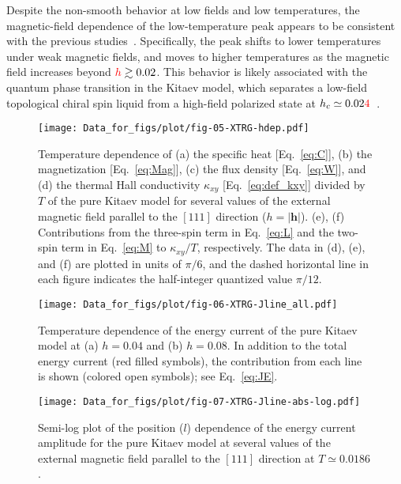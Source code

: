 \documentclass[twocolumn,superscriptaddress,showpacs, longbibliography, aps, prx]{revtex4-2}
\newcommand{\red}[1]{\textcolor{red}{#1}}
\begin{document}
Despite the non-smooth behavior at low fields and low temperatures, the magnetic-field dependence of the low-temperature peak appears to be consistent with the previous studies~\cite{YoshitakeNKM2020,Li2020,LiZWWGQLGL2021,LiLXGQLS2024}. 
Specifically, the peak shifts to lower temperatures under weak magnetic fields, and moves to higher temperatures as the magnetic field increases beyond $%
\red{h} \gtrsim 0.02$.
This behavior is likely associated with the quantum phase transition in the Kitaev model, which separates a low-field topological chiral spin liquid from a high-field polarized state at $h_c \simeq 0.02\red{4}$\red{~\cite{Gohlke2018}}. %

\begin{figure}
  \begin{center}
    \texttt{[image: Data\_for\_figs/plot/fig-05-XTRG-hdep.pdf]}
  \end{center}
  \caption{Temperature dependence of (a) the specific heat [Eq.~\eqref{eq:C}], (b) the magnetization [Eq.~\eqref{eq:Mag}], (c) the flux density [Eq.~\eqref{eq:W}], and (d) the thermal Hall conductivity $\kappa_{xy}$ [Eq.~\eqref{eq:def_kxy}] divided by $T$ of the pure Kitaev model for several values of the external magnetic field parallel to the $[111]$ direction ($h=|\bm{h}|$). (e), (f) Contributions from the three-spin term in Eq.~\eqref{eq:L} and the two-spin term in Eq.~\eqref{eq:M} to $\kappa_{xy}/T$, respectively. The data in (d), (e), and (f) are plotted in units of $\pi/6$, and the dashed horizontal line in each figure indicates the half-integer quantized value $\pi/12$.
  }
  \label{fig:CMF_pure}
\end{figure}

\begin{figure}[htb]
  \begin{center}
    \texttt{[image: Data\_for\_figs/plot/fig-06-XTRG-Jline\_all.pdf]}
  \end{center}
  \caption{Temperature dependence of the energy current of the pure Kitaev model at (a) $h=0.04$ and (b) $h=0.08$. In addition to the total energy current (red filled symbols), the contribution from each line is shown (colored open symbols); see Eq.~\eqref{eq:JE}.
}
  \label{fig:J_line}
\end{figure}

\begin{figure}[htb]
  \begin{center}
    \texttt{[image: Data\_for\_figs/plot/fig-07-XTRG-Jline-abs-log.pdf]}
  \end{center}
  \caption{Semi-log plot of the position ($l$) dependence of the energy current amplitude for the pure Kitaev model at several values of the external magnetic field parallel to the $[111]$ direction at $T \simeq 0.0186$.} 
  \label{fig:J_line_dep}
\end{figure}
\end{document}
